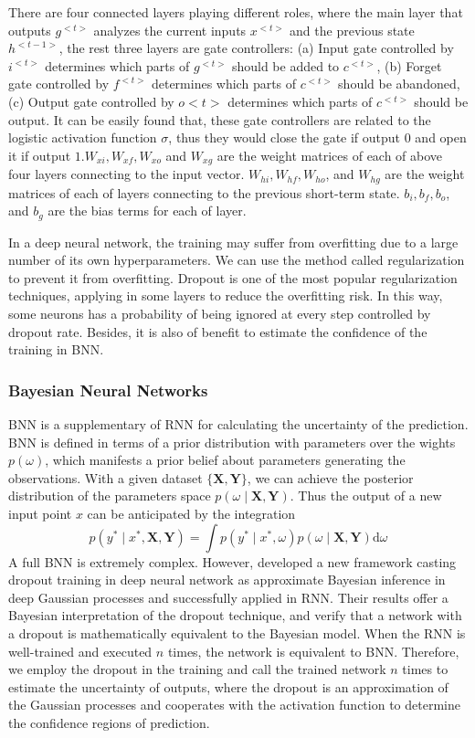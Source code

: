 There are four connected layers playing different roles, where the main layer that outputs $g^{<t>}$ analyzes the current inputs $x^{<t>}$ and the previous state $h^{<t-1>}$, the rest three layers are gate controllers: (a) Input gate controlled by $i^{<t>}$ determines which parts of $g^{<t>}$ should be added to $c^{<t>}$, (b) Forget gate controlled by $f^{<t>}$ determines which parts of $c^{<t>}$ should be abandoned, (c) Output gate controlled by $o{<t>}$ determines which parts of $c^{<t>}$ should be output. It can be easily found that, these gate controllers are related to the logistic activation function $\sigma$, thus they would close the gate if output 0 and open it if output $1 . W_{x i}, W_{x f}, W_{x o}$ and $W_{x g}$ are the weight matrices of each of above four layers connecting to the input vector. $W_{h i}, W_{h f}, W_{h o}$, and $W_{h g}$ are the weight matrices of each of layers connecting to the previous short-term state. $b_{i}, b_{f}, b_{o}$, and $b_{g}$ are the bias terms for each of layer.

In a deep neural network, the training may suffer from overfitting due to a large number of its own hyperparameters. We can use the method called regularization to prevent it from overfitting. Dropout is one of the most popular regularization techniques, applying in some layers to reduce the overfitting risk. In this way, some neurons has a probability of being ignored at every step controlled by dropout rate. Besides, it is also of benefit to estimate the confidence of the training in BNN.

\subsubsection{Bayesian Neural Networks}
BNN is a supplementary of RNN for calculating the uncertainty of the prediction. BNN is defined in terms of a prior distribution with parameters over the wights $p(\omega)$, which manifests a prior belief about parameters generating the observations. With a given dataset $\{\mathbf{X}, \mathbf{Y}\}$, we can achieve the posterior distribution of the parameters space $p(\omega \mid \mathbf{X}, \mathbf{Y})$. Thus the output of a new input point $x$ can be anticipated by the integration
$$
p\left(y^{*} \mid x^{*}, \mathbf{X}, \mathbf{Y}\right)=\int p\left(y^{*} \mid x^{*}, \omega\right) p(\omega \mid \mathbf{X}, \mathbf{Y}) \mathrm{d} \omega
$$
A full BNN is extremely complex. However, \cite{gal2016theoretically} developed a new framework casting dropout training in deep neural network as approximate Bayesian inference in deep Gaussian processes and successfully applied in RNN. Their results offer a Bayesian interpretation of the dropout technique, and verify that a network with a dropout is mathematically equivalent to the Bayesian model. When the RNN is well-trained and executed $n$ times, the network is equivalent to BNN. Therefore, we employ the dropout in the training and call the trained network $n$ times to estimate the uncertainty of outputs, where the dropout is an approximation of the Gaussian processes and cooperates with the activation function to determine the confidence regions of prediction.